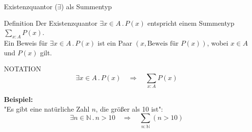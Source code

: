 \documentclass{beamer}
\begin{document}
\begin{frame}{Existenzquantor (\(\exists\)) als Summentyp}
    \begin{block}{Definition}
        Der Existenzquantor \( \exists x \in A \, . \, P(x) \) entspricht einem Summentyp \( \sum_{x : A} P(x) \). \\
        Ein Beweis für \( \exists x \in A \, . \, P(x) \) ist ein Paar \((x, \text{Beweis für } P(x))\), wobei \( x \in A \) und \( P(x) \) gilt.
    \end{block}

    \begin{block}{NOTATION}
        \[
        \exists x \in A \, . \, P(x) \quad \Rightarrow \quad \sum_{x : A} P(x)
        \]
    \end{block}

    \textbf{Beispiel:} \\
    "Es gibt eine natürliche Zahl \( n \), die größer als 10 ist":
    \[
    \exists n \in \mathbb{N} \, . \, n > 10 \quad \Rightarrow \quad \sum_{n : \mathbb{N}} (n > 10)
    \]
\end{frame}
\end{document}
